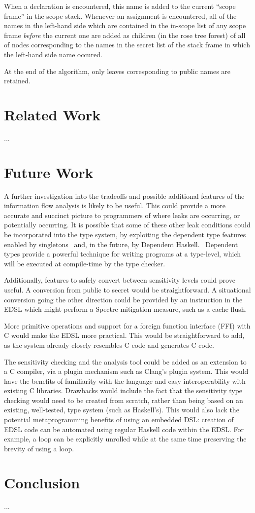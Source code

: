 \documentclass[10pt, conference]{IEEEtran}
\begin{document}
When a declaration is encountered, this name is added to the current ``scope
frame'' in the scope stack. Whenever an assignment is encountered, all of the
names in the left-hand side which are contained in the in-scope list of any
scope frame \textit{before} the current one are added as children (in the rose
tree forest) of all of nodes corresponding to the names in the secret list of
the stack frame in which the left-hand side name occured.

At the end of the algorithm, only leaves corresponding to public names are
retained.


\section{Related Work}
...

\section{Future Work}
A further investigation into the tradeoffs and possible additional features of
the information flow analysis is likely to be useful. This could provide a more
accurate and succinct picture to programmers of where leaks are occurring, or
potentially occurring. It is possible that some of these other leak conditions
could be incorporated into the type system, by exploiting the dependent type
features enabled by singletons~\cite{SingletonsPaper} and, in the future, by Dependent Haskell.~\cite{DepHaskSpec}
Dependent types provide a powerful technique for writing programs at a type-level, which
will be executed at compile-time by the type checker.~\cite{CertProg, DepHaskSpec}

Additionally, features to safely convert between sensitivity levels could prove
useful. A conversion from public to secret would be straightforward. A situational conversion
going the other direction could be provided by an instruction in the EDSL
which might perform a Spectre mitigation measure, such as a cache flush. \cite{PLtea-james}

More primitive operations and support for a foreign function interface (FFI)
with C would make the EDSL more practical. This would be straightforward to add,
as the system already closely resembles C code and generates C code.

The sensitivity checking and the analysis tool could be added as an extension to
a C compiler, via a plugin mechanism such as Clang's plugin system. This would
have the benefits of familiarity with the language and easy interoperability
with existing C libraries. Drawbacks would include the fact that the sensitivity type
checking would need to be created from scratch, rather than being based on an existing, well-tested,
type system (such as Haskell's). This would also lack the potential metaprogramming
benefits of using an embedded DSL: creation of EDSL code can be automated using
regular Haskell code within the EDSL. For example, a loop can be explicitly unrolled while
at the same time preserving the brevity of using a loop.

\section{Conclusion}
...



\end{document}
